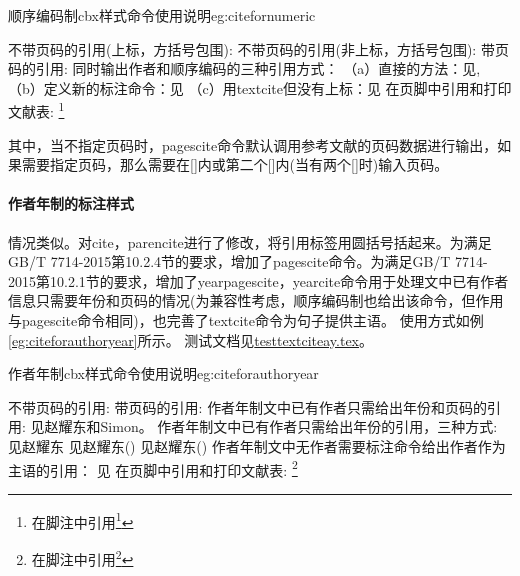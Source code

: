 \begin{example}{顺序编码制cbx样式命令使用说明}{eg:citefornumeric}
\begin{texlist}
不带页码的引用(上标，方括号包围):
    \cite{Peebles2001-100-100}
不带页码的引用(非上标，方括号包围):
    \parencite{Miroslav2004--}
带页码的引用:
    \cite[见][49页]{蔡敏2006--}  \parencite[见][49页]{Miroslav2004--}
同时输出作者和顺序编码的三种引用方式：
    （a）直接的方法：见\citeauthor{refb}\cite{refb}, \citeauthor{refc}\cite{refc}
    （b）定义新的标注命令：见
    （c）用textcite但没有上标：见\textcite{refb,refc}
在页脚中引用和打印文献表:
    \footnote{在脚注中引用\footcite{赵学功2001--}}  
    \end{texlist}
\end{example}

其中，当不指定页码时，pagescite命令默认调用参考文献的页码数据进行输出，如果需要指定页码，那么需要在[]内或第二个[]内(当有两个[]时)输入页码。


\paragraph{作者年制的标注样式} 情况类似。对cite，parencite进行了修改，将引用标签用圆括号括起来。为满足GB/T 7714-2015第10.2.4节的要求，增加了pagescite命令。为满足GB/T 7714-2015第10.2.1节的要求，增加了yearpagescite，yearcite命令用于处理文中已有作者信息只需要年份和页码的情况(为兼容性考虑，顺序编码制也给出该命令，但作用与pagescite命令相同)，也完善了textcite命令为句子提供主语。
使用方式如例\ref{eg:citeforauthoryear}所示。
测试文档见\href{run:example/testtextciteay.tex}{testtextciteay.tex}。

\begin{example}{作者年制cbx样式命令使用说明}{eg:citeforauthoryear}
\begin{texlist}
不带页码的引用:
    \cite{Peebles2001-100-100}  \parencite{Miroslav2004--}
带页码的引用:
    \cite[见][49页]{蔡敏2006--} \parencite[见][49页]{Miroslav2004--}
作者年制文中已有作者只需给出年份和页码的引用:
    见赵耀东和Simon。
作者年制文中已有作者只需给出年份的引用，三种方式:
    见赵耀东
    见赵耀东(\cite*{赵耀东1998--})
    见赵耀东(\citeyear{赵耀东1998--})
作者年制文中无作者需要标注命令给出作者作为主语的引用：
    见\textcite{赵耀东1998--}
在页脚中引用和打印文献表:
    \footnote{在脚注中引用\footcite{赵学功2001--}} 
    \end{texlist}
\end{example}

